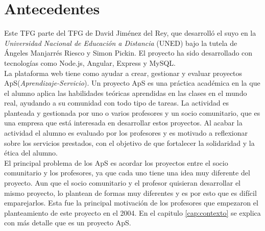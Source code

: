 \documentclass[11pt]{book}
\begin{document}
\section{Antecedentes}
Este TFG parte del TFG de David Jiménez del Rey, que desarrolló el suyo en la \emph{Universidad Nacional de Educación a Distancia} (UNED) bajo la tutela de Ángeles Manjarrés Riesco y Simon Pickin. El proyecto ha sido desarrollado con tecnologías como Node.js, Angular, Express y MySQL.\\
La plataforma web tiene como ayudar a crear, gestionar y evaluar proyectos ApS(\emph{Aprendizaje-Servicio}). Un proyecto ApS es una práctica académica en la que el alumno aplica las habilidades teóricas aprendidas en las clases en el mundo real, ayudando a su comunidad con todo tipo de tareas. La actividad es planteada y gestionada por uno o varios profesores y un socio comunitario, que es una empresa que está interesada en desarrollar estos proyectos. Al acabar la actividad el alumno es evaluado por los profesores y es motivado a reflexionar sobre los servicios prestados, con el objetivo de que fortalecer la solidaridad y la ética del alumno. \\
El principal problema de los ApS es acordar los proyectos entre el socio comunitario y los profesores, ya que cada uno tiene una idea muy diferente del proyecto. Aun que el socio comunitario y el profesor quisieran desarrollar el mismo proyecto, lo plantean de formas muy diferentes y es por esto que es difícil emparejarlos. Esta fue la principal motivación de los profesores que empezaron el planteamiento de este proyecto en el 2004. En el capitulo \ref{cap:contexto} se explica con más detalle que es un proyecto ApS.\\
\end{document}
